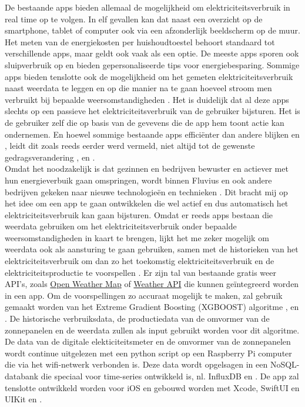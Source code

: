 \documentclass{hogent-article}
\begin{document}
De bestaande apps bieden allemaal de mogelijkheid om elektriciteitsverbruik in real time op te volgen. In elf gevallen kan dat naast een overzicht op de smartphone, tablet of computer ook via een afzonderlijk beeldscherm op de muur. Het meten van de energiekosten per huishoudtoestel behoort standaard tot verschillende apps, maar geldt ook vaak als een optie. De meeste apps sporen ook sluipverbruik op en bieden gepersonaliseerde tips voor energiebesparing. Sommige apps bieden tenslotte ook de mogelijkheid om het gemeten elektriciteitsverbruik naast weerdata te leggen en op die manier na te gaan hoeveel stroom men verbruikt bij bepaalde weersomstandigheden \autocite{Deman2021}. Het is duidelijk dat al deze apps slechts op een passieve het elektriciteitsverbruik van de gebruiker bijsturen. Het is de gebruiker zelf die op basis van de gevevens die de app hem toont actie kan ondernemen. En hoewel sommige bestaande apps efficiënter dan andere blijken \autocite{Mack2016} en \autocite{Wood2019}, leidt dit zoals reeds eerder werd vermeld, niet altijd tot de gewenste gedragsverandering \autocite{Wemyss2019}, \autocite{Mack2019} en  \autocite{VREG2021}. \\

Omdat het noodzakelijk is dat gezinnen en bedrijven bewuster en actiever met hun energieverbuik gaan omspringen, wordt binnen Fluvius en ook andere bedrijven gekeken naar nieuwe technologieën en technieken \autocite{Verdoodt2018}. Dit bracht mij op het idee om een app te gaan ontwikkelen die wel actief en dus automatisch het elektriciteitsverbruik kan gaan bijsturen. Omdat er reeds apps bestaan die weerdata gebruiken om het elektriciteitsverbruik onder bepaalde weersomstandigheden in kaart te brengen, lijkt het me zeker mogelijk om weerdata ook als aansturing te gaan gebruiken, samen met de historieken van het elektriciteitsverbruik om dan zo het toekomstig elektriciteitsverbruik en de elektriciteitsproductie te voorspellen \autocite{Guo2022}. Er zijn tal van bestaande gratis weer API's, zoals \href{https://openweathermap.org/api}{Open Weather Map} of \href{https://www.weatherapi.com/}{Weather API} die kunnen geïntegreerd worden in een app. Om de voorspellingen zo accuraat mogelijk te maken, zal gebruik gemaakt worden van het Extreme Gradient Boosting (XGBOOST) algoritme \autocite{Ledmaoui2023}, \autocite{Wang2022} en \autocite{BarreraAnimas2022}. De historische verbruiksdata, de productiedata van de omvormer van de zonnepanelen en de weerdata zullen als input gebruikt worden voor dit algoritme. De data van de digitale elekticiteitsmeter en de omvormer van de zonnepanelen wordt continue uitgelezen met een python script op een Raspberry Pi computer die via het wifi-netwerk verbonden is. Deze data wordt opgelsagen in een NoSQL-databank die speciaal voor time-series ontwikkeld is, nl. InfluxDB \autocite{Balis2017} en  \autocite{Struckov2019}. De app zal tenslotte ontwikkeld worden voor iOS en gebouwd worden met Xcode, SwiftUI en UIKit \autocite{Allardice} en \autocite{Firtman2022}. \\
\end{document}
